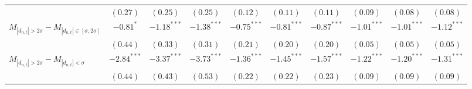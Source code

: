 \begin{tabular}{lccccccccc}
   & $(0.27)$ & $(0.25)$ & $(0.25)$ & $(0.12)$ & $(0.11)$ & $(0.11)$ & $(0.09)$ & $(0.08)$ & $(0.08)$ \\ 
  $M_{|d_{n,t}| > 2 \sigma} - M_{|d_{n,t}| \in [\sigma, 2\sigma]}$ & $-0.81^{*}$ & $-1.18^{***}$ & $-1.38^{***}$ & $-0.75^{***}$ & $-0.81^{***}$ & $-0.87^{***}$ & $-1.01^{***}$ & $-1.01^{***}$ & $-1.12^{***}$ \\ 
   & $(0.44)$ & $(0.33)$ & $(0.31)$ & $(0.21)$ & $(0.20)$ & $(0.20)$ & $(0.05)$ & $(0.05)$ & $(0.05)$ \\ 
  $M_{|d_{n,t}| > 2 \sigma} - M_{|d_{n,t}| < \sigma}$ & $-2.84^{***}$ & $-3.37^{***}$ & $-3.73^{***}$ & $-1.36^{***}$ & $-1.45^{***}$ & $-1.57^{***}$ & $-1.22^{***}$ & $-1.20^{***}$ & $-1.31^{***}$ \\ 
   & $(0.44)$ & $(0.43)$ & $(0.53)$ & $(0.22)$ & $(0.22)$ & $(0.23)$ & $(0.09)$ & $(0.09)$ & $(0.09)$ \\ 
   \hline 
\end{tabular}
